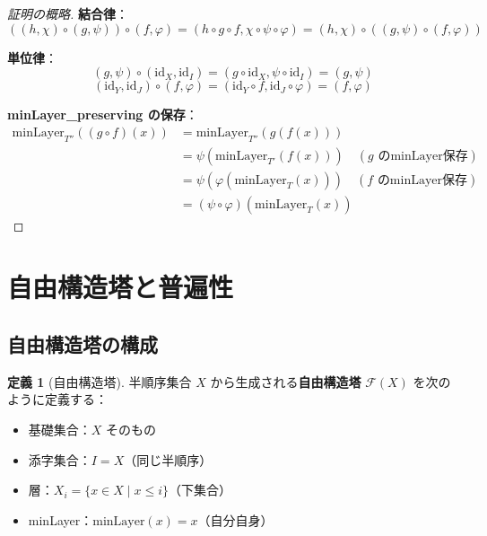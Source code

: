 \documentclass[a4paper,12pt]{ltjsarticle}
\theoremstyle{definition}
\newtheorem{definition}[theorem]{定義}
\newcommand{\id}{\mathrm{id}}
\begin{document}
\begin{proof}[証明の概略]
\textbf{結合律}：
\[
((h, \chi) \circ (g, \psi)) \circ (f, \varphi) = (h \circ g \circ f, \chi \circ \psi \circ \varphi) = (h, \chi) \circ ((g, \psi) \circ (f, \varphi))
\]

\textbf{単位律}：
\[
(g, \psi) \circ (\id_X, \id_I) = (g \circ \id_X, \psi \circ \id_I) = (g, \psi)
\]
\[
(\id_Y, \id_J) \circ (f, \varphi) = (\id_Y \circ f, \id_J \circ \varphi) = (f, \varphi)
\]

\textbf{minLayer\_preserving の保存}：
\begin{align*}
\mathrm{minLayer}_{T''}((g \circ f)(x))
&= \mathrm{minLayer}_{T''}(g(f(x))) \\
&= \psi(\mathrm{minLayer}_{T'}(f(x))) \quad (\text{$g$ のminLayer保存}) \\
&= \psi(\varphi(\mathrm{minLayer}_T(x))) \quad (\text{$f$ のminLayer保存}) \\
&= (\psi \circ \varphi)(\mathrm{minLayer}_T(x))
\end{align*}
\end{proof}

\begin{center}
\end{center}

\section{自由構造塔と普遍性}

\subsection{自由構造塔の構成}

\begin{definition}[自由構造塔]\label{def:free_tower}
半順序集合 $X$ から生成される\textbf{自由構造塔} $\mathcal{F}(X)$ を次のように定義する：
\begin{itemize}
\item 基礎集合：$X$ そのもの
\item 添字集合：$I = X$（同じ半順序）
\item 層：$X_i = \{x \in X \mid x \leq i\}$（下集合）
\item minLayer：$\mathrm{minLayer}(x) = x$（自分自身）
\end{itemize}
\end{definition}
\end{document}
